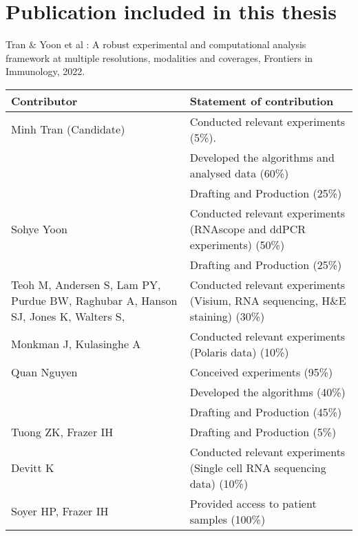 

\section*{Publication included in this thesis}

\begin{instructional}
	Tran $\&$ Yoon et al \cite{tran2022robust}: A robust experimental and computational analysis framework at multiple resolutions, modalities and coverages, Frontiers in Immunology, 2022. 
\begin{table}[ht]	
\begin{tabularx}{\textwidth}{|X|X|} 
 \hline
 Contributor & Statement of contribution \\ 
 \hline\hline
 Minh Tran (Candidate) & Conducted relevant experiments (5\%). \\ 
 & Developed the algorithms and analysed data (60\%)  \\ 
 & Drafting and Production (25\%) \\
 \hline
 Sohye Yoon & Conducted relevant experiments (RNAscope and ddPCR experiments) (50\%)   \\
 & Drafting and Production (25\%) \\
 \hline
 Teoh M, Andersen S, Lam PY, Purdue BW, Raghubar A, Hanson SJ, Jones K, Walters S,  & Conducted relevant experiments (Visium, RNA sequencing, H$\&$E staining) (30\%) \\
 \hline
 Monkman J, Kulasinghe A & Conducted relevant experiments (Polaris data) (10\%) \\
 \hline
 Quan Nguyen & Conceived experiments (95\%) \\
  & Developed the algorithms (40\%) \\
  & Drafting and Production (45\%) \\
 \hline
 Tuong ZK, Frazer IH & Drafting and Production (5\%) \\
 \hline
 Devitt K & Conducted relevant experiments (Single cell RNA sequencing data) (10\%) \\
 \hline
 Soyer HP, Frazer IH & Provided access to patient samples (100\%)  \\ [1ex] 
 \hline
\end{tabularx}
\end{table} 
\end{instructional}

